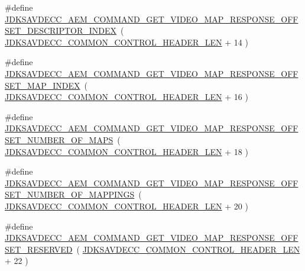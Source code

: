 \begin{DoxyCompactItemize}
\item 
\#define \hyperlink{group__command__get__video__map__response_gaa43b6d7f0705064ae671885b5513b9f4}{J\+D\+K\+S\+A\+V\+D\+E\+C\+C\+\_\+\+A\+E\+M\+\_\+\+C\+O\+M\+M\+A\+N\+D\+\_\+\+G\+E\+T\+\_\+\+V\+I\+D\+E\+O\+\_\+\+M\+A\+P\+\_\+\+R\+E\+S\+P\+O\+N\+S\+E\+\_\+\+O\+F\+F\+S\+E\+T\+\_\+\+D\+E\+S\+C\+R\+I\+P\+T\+O\+R\+\_\+\+I\+N\+D\+EX}~( \hyperlink{group__jdksavdecc__avtp__common__control__header_gaae84052886fb1bb42f3bc5f85b741dff}{J\+D\+K\+S\+A\+V\+D\+E\+C\+C\+\_\+\+C\+O\+M\+M\+O\+N\+\_\+\+C\+O\+N\+T\+R\+O\+L\+\_\+\+H\+E\+A\+D\+E\+R\+\_\+\+L\+EN} + 14 )
\item 
\#define \hyperlink{group__command__get__video__map__response_ga1eeb126c7bd77e247a01e061cb7f63b1}{J\+D\+K\+S\+A\+V\+D\+E\+C\+C\+\_\+\+A\+E\+M\+\_\+\+C\+O\+M\+M\+A\+N\+D\+\_\+\+G\+E\+T\+\_\+\+V\+I\+D\+E\+O\+\_\+\+M\+A\+P\+\_\+\+R\+E\+S\+P\+O\+N\+S\+E\+\_\+\+O\+F\+F\+S\+E\+T\+\_\+\+M\+A\+P\+\_\+\+I\+N\+D\+EX}~( \hyperlink{group__jdksavdecc__avtp__common__control__header_gaae84052886fb1bb42f3bc5f85b741dff}{J\+D\+K\+S\+A\+V\+D\+E\+C\+C\+\_\+\+C\+O\+M\+M\+O\+N\+\_\+\+C\+O\+N\+T\+R\+O\+L\+\_\+\+H\+E\+A\+D\+E\+R\+\_\+\+L\+EN} + 16 )
\item 
\#define \hyperlink{group__command__get__video__map__response_gae58dc53f84dbeac4cd43fb5b4c6d3e73}{J\+D\+K\+S\+A\+V\+D\+E\+C\+C\+\_\+\+A\+E\+M\+\_\+\+C\+O\+M\+M\+A\+N\+D\+\_\+\+G\+E\+T\+\_\+\+V\+I\+D\+E\+O\+\_\+\+M\+A\+P\+\_\+\+R\+E\+S\+P\+O\+N\+S\+E\+\_\+\+O\+F\+F\+S\+E\+T\+\_\+\+N\+U\+M\+B\+E\+R\+\_\+\+O\+F\+\_\+\+M\+A\+PS}~( \hyperlink{group__jdksavdecc__avtp__common__control__header_gaae84052886fb1bb42f3bc5f85b741dff}{J\+D\+K\+S\+A\+V\+D\+E\+C\+C\+\_\+\+C\+O\+M\+M\+O\+N\+\_\+\+C\+O\+N\+T\+R\+O\+L\+\_\+\+H\+E\+A\+D\+E\+R\+\_\+\+L\+EN} + 18 )
\item 
\#define \hyperlink{group__command__get__video__map__response_ga7b60ab8ffc221a5baf274bce064dbbab}{J\+D\+K\+S\+A\+V\+D\+E\+C\+C\+\_\+\+A\+E\+M\+\_\+\+C\+O\+M\+M\+A\+N\+D\+\_\+\+G\+E\+T\+\_\+\+V\+I\+D\+E\+O\+\_\+\+M\+A\+P\+\_\+\+R\+E\+S\+P\+O\+N\+S\+E\+\_\+\+O\+F\+F\+S\+E\+T\+\_\+\+N\+U\+M\+B\+E\+R\+\_\+\+O\+F\+\_\+\+M\+A\+P\+P\+I\+N\+GS}~( \hyperlink{group__jdksavdecc__avtp__common__control__header_gaae84052886fb1bb42f3bc5f85b741dff}{J\+D\+K\+S\+A\+V\+D\+E\+C\+C\+\_\+\+C\+O\+M\+M\+O\+N\+\_\+\+C\+O\+N\+T\+R\+O\+L\+\_\+\+H\+E\+A\+D\+E\+R\+\_\+\+L\+EN} + 20 )
\item 
\#define \hyperlink{group__command__get__video__map__response_gad9349d2e55a543dffc39753db0062a5c}{J\+D\+K\+S\+A\+V\+D\+E\+C\+C\+\_\+\+A\+E\+M\+\_\+\+C\+O\+M\+M\+A\+N\+D\+\_\+\+G\+E\+T\+\_\+\+V\+I\+D\+E\+O\+\_\+\+M\+A\+P\+\_\+\+R\+E\+S\+P\+O\+N\+S\+E\+\_\+\+O\+F\+F\+S\+E\+T\+\_\+\+R\+E\+S\+E\+R\+V\+ED}~( \hyperlink{group__jdksavdecc__avtp__common__control__header_gaae84052886fb1bb42f3bc5f85b741dff}{J\+D\+K\+S\+A\+V\+D\+E\+C\+C\+\_\+\+C\+O\+M\+M\+O\+N\+\_\+\+C\+O\+N\+T\+R\+O\+L\+\_\+\+H\+E\+A\+D\+E\+R\+\_\+\+L\+EN} + 22 )

\end{DoxyCompactItemize}
